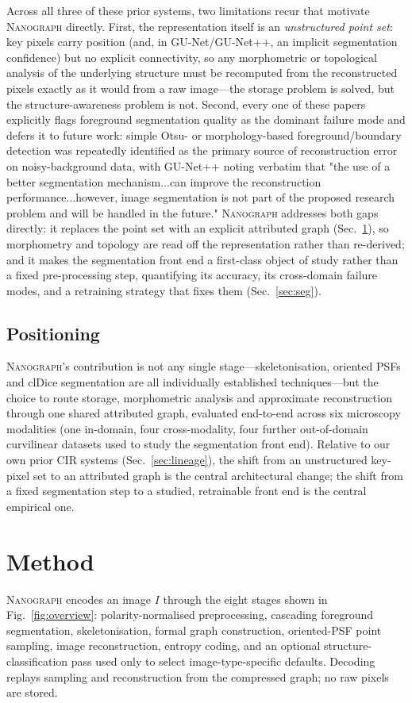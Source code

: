 \documentclass[10pt,a4paper]{article}
\newcommand{\method}{\textnormal{\textsc{Nanograph}}\xspace}
\begin{document}
Across all three of these prior systems, two limitations recur that motivate
\method directly. First, the representation itself is an \emph{unstructured
point set}: key pixels carry position (and, in GU-Net/GU-Net++, an implicit
segmentation confidence) but no explicit connectivity, so any morphometric or
topological analysis of the underlying structure must be recomputed from the
reconstructed pixels exactly as it would from a raw image---the storage
problem is solved, but the structure-awareness problem is not. Second, every
one of these papers explicitly flags foreground segmentation quality as the
dominant failure mode and defers it to future work: simple Otsu- or
morphology-based foreground/boundary detection was repeatedly identified as
the primary source of reconstruction error on noisy-background data, with
GU-Net++ noting verbatim that "the use of a better segmentation
mechanism...can improve the reconstruction performance...however, image
segmentation is not part of the proposed research problem and will be
handled in the future." \method addresses both gaps directly: it replaces
the point set with an explicit attributed graph (Sec.~\ref{sec:method}), so
morphometry and topology are read off the representation rather than
re-derived; and it makes the segmentation front end a first-class object of
study rather than a fixed pre-processing step, quantifying its accuracy, its
cross-domain failure modes, and a retraining strategy that fixes them
(Sec.~\ref{sec:seg}).

\subsection{Positioning}
\method's contribution is not any single stage---skeletonisation, oriented
PSFs and clDice segmentation are all individually established
techniques---but the choice to route storage, morphometric analysis and
approximate reconstruction through one shared attributed graph, evaluated
end-to-end across six microscopy modalities (one in-domain, four
cross-modality, four further out-of-domain curvilinear datasets used to study
the segmentation front end). Relative to our own prior CIR systems
(Sec.~\ref{sec:lineage}), the shift from an unstructured key-pixel set to an
attributed graph is the central architectural change; the shift from a fixed
segmentation step to a studied, retrainable front end is the central
empirical one.

\section{Method}\label{sec:method}
\method encodes an image $I$ through the eight stages shown in
Fig.~\ref{fig:overview}: polarity-normalised preprocessing, cascading
foreground segmentation, skeletonisation, formal graph construction,
oriented-PSF point sampling, image reconstruction, entropy coding, and an
optional structure-classification pass used only to select
image-type-specific defaults. Decoding replays sampling and reconstruction
from the compressed graph; no raw pixels are stored.
\end{document}
